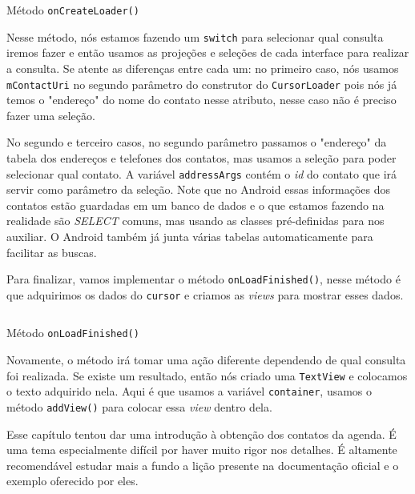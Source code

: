 \documentclass[a4paper,12pt,brazil,oneside]{book}
\begin{document}
		 \begin{listing}[H]
		\inputminted[linenos=true,fontsize=\small,frame=lines, framesep=2mm, tabsize=2,numbersep=5pt]{java}{src/api/contacts/oncreateloader2.java}
		\caption{Método \texttt{onCreateLoader()}}
		\label{code:contactdetailssoncreateloader}
		\end{listing} 			
	
	Nesse método, nós estamos fazendo um \texttt{switch} para selecionar qual consulta iremos fazer e então usamos as projeções e seleções de cada interface para realizar a consulta. Se atente as diferenças entre cada um: no primeiro caso, nós usamos \texttt{mContactUri} no segundo parâmetro do construtor do \texttt{CursorLoader} pois nós já temos o "endereço" do nome do contato nesse atributo, nesse caso não é preciso fazer uma seleção.

	 No segundo e terceiro casos, no segundo parâmetro passamos o "endereço" da tabela dos endereços e telefones dos contatos, mas usamos a seleção para poder selecionar qual contato. A variável \texttt{addressArgs} contém o \emph{id} do contato que irá servir como parâmetro da seleção. Note que no Android essas informações dos contatos estão guardadas em um banco de dados e o que estamos fazendo na realidade são \emph{SELECT} comuns, mas usando as classes pré-definidas para nos auxiliar. O Android também já junta várias tabelas automaticamente para facilitar as buscas.

	Para finalizar, vamos implementar o método \texttt{onLoadFinished()}, nesse método é que adquirimos os dados do \texttt{cursor} e criamos as \emph{views} para mostrar esses dados. 

		 \begin{listing}[H]
		\inputminted[linenos=true,fontsize=\small,frame=lines, framesep=2mm, tabsize=2,numbersep=5pt]{java}{src/api/contacts/onloadfinished2.java}
		\caption{Método \texttt{onLoadFinished()}}
		\label{code:contactsdetailsonloadfinished}
		\end{listing} 			

		Novamente, o método irá tomar uma ação diferente dependendo de qual consulta foi realizada. Se existe um resultado, então nós criado uma \texttt{TextView} e colocamos o texto adquirido nela. Aqui é que usamos a variável \texttt{container}, usamos o método \texttt{addView()} para colocar essa \emph{view} dentro dela.

	
		Esse capítulo tentou dar uma introdução à obtenção dos contatos da agenda. É uma tema especialmente difícil por haver muito rigor nos detalhes. É altamente recomendável estudar mais a fundo a lição presente na documentação oficial e o exemplo oferecido por eles. 
\end{document}
